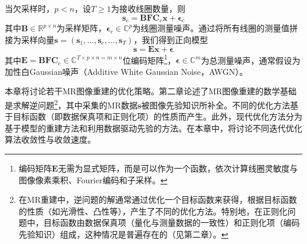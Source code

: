\documentclass[12pt]{article}
\begin{document}
当欠采样时，$p<n$，设$T\ge 1$为接收线圈数量，则
\begin{equation}
    \bm{s}_c=\mathbf{B}\mathbf{F}\mathbf{C}_c\bm{x}+\bm{\epsilon}_c
    \label{equ:3.3a}
\end{equation}
其中$\mathbf{B}\in\mathbb{R}^{p\times n}$为采样矩阵，$\bm{\epsilon}_c\in\mathbb{C}^p$为线圈测量噪声。通过将所有线圈的测量值拼接为采样向量$\bm{s}=(\bm{s}_1,\ldots,\bm{s}_c,\ldots,\bm{s}_T)$，我们得到正向模型
\begin{equation}
    \boxed{\bm{s}=\mathbf{E}\bm{x}+\bm{\epsilon}}
    \label{equ:3.3}
\end{equation}
其中$\mathbf{E}=\mathbf{B}\mathbf{F}\mathbf{C}_c\in\mathbb{C}^{T\times p\times n=m\times n}$位编码矩阵\footnote{编码矩阵$\mathbf{E}$无需为显式矩阵，而是可以作为一个函数，依次计算线圈灵敏度与图像像素乘积、Fourier编码和子采样。}，$\bm{\epsilon}\in\mathbb{C}^m$为总测量噪声，通常假设为加性白Gaussian噪声（Additive White Gaussian Noise，AWGN）\label{term:AWGN}。

本章将讨论若干MR图像重建的优化策略。第二章论述了MR图像重建的数学基础是求解逆问题\footnote{在MR重建中，逆问题的解通常通过优化一个目标函数来获得，根据目标函数的性质（如光滑性、凸性等），产生了不同的优化方法。特别地，在正则化问题中，目标函数由数据保真项（量化与测量数据的一致性）和正则化项（编码先验知识）组成，这种情况是普遍存在的（见第二章）。}，其中采集的MR数据$\bm{s}$被图像先验知识所补全。不同的优化方法基于目标函数（即数据保真项和正则化项）的性质而产生。此外，现代优化方法分为基于模型的重建方法和利用数据驱动先验的方法。在本章中，将讨论不同迭代优化算法收敛性与收敛速度。
\end{document}
